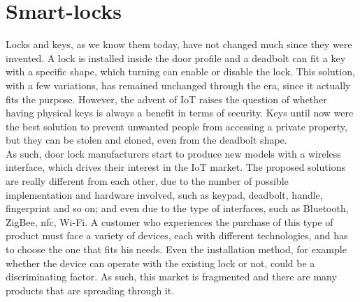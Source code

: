 \section{Smart-locks}
Locks and keys, as we know them today, have not changed much since they were invented. A lock is installed inside the door profile and a deadbolt can fit a key with a specific shape, which turning can enable or disable the lock. This solution, with a few variations, has remained unchanged through the era, since it actually fits the purpose. However, the advent of \acrshort{IoT} raises the question of whether having physical keys is always a benefit in terms of security. Keys until now were the best solution to prevent unwanted people from accessing a private property, but they can be stolen and cloned, even from the deadbolt shape. 
\\ As such, door lock manufacturers start to produce new models with a wireless interface, which drives their interest in the IoT market. The proposed solutions are really different from each other, due to the number of possible implementation and hardware involved, such as keypad, deadbolt, handle, fingerprint and so on; and even due to the type of interfaces, such as Bluetooth, ZigBee, \acrshort{nfc}, Wi-Fi.
A customer who experiences the purchase of this type of product must face a variety of devices, each with different technologies, and has to choose the one that fits his needs. Even the installation method, for example whether the device can operate with the existing lock or not, could be a discriminating factor. As such, this market is fragmented and there are many products that are spreading through it. 

